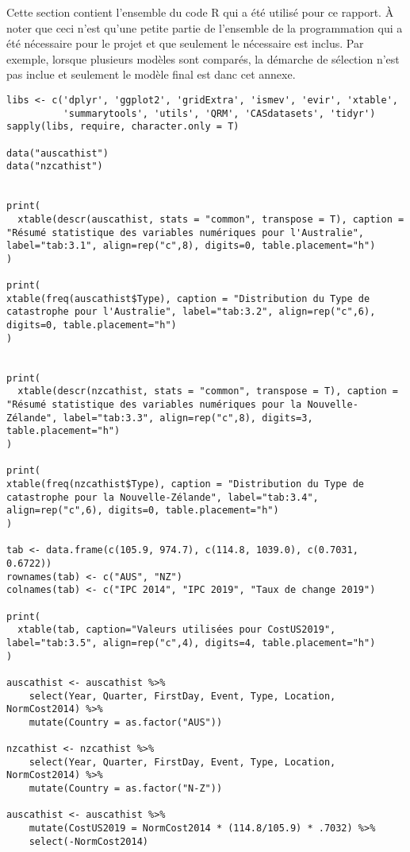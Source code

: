 Cette section contient l'ensemble du code \textsf{R} qui a été utilisé pour ce rapport. À noter que ceci n'est qu'une petite partie de l'ensemble de la programmation qui a été nécessaire pour le projet et que seulement le nécessaire est inclus. Par exemple, lorsque plusieurs modèles sont comparés, la démarche de sélection n'est pas inclue et seulement le modèle final est danc cet annexe.

\begin{lstlisting}
libs <- c('dplyr', 'ggplot2', 'gridExtra', 'ismev', 'evir', 'xtable',
          'summarytools', 'utils', 'QRM', 'CASdatasets', 'tidyr')
sapply(libs, require, character.only = T)

data("auscathist")
data("nzcathist")


print(
  xtable(descr(auscathist, stats = "common", transpose = T), caption = "Résumé statistique des variables numériques pour l'Australie", label="tab:3.1", align=rep("c",8), digits=0, table.placement="h")
)

print(
xtable(freq(auscathist$Type), caption = "Distribution du Type de catastrophe pour l'Australie", label="tab:3.2", align=rep("c",6), digits=0, table.placement="h")
)


print(
  xtable(descr(nzcathist, stats = "common", transpose = T), caption = "Résumé statistique des variables numériques pour la Nouvelle-Zélande", label="tab:3.3", align=rep("c",8), digits=3, table.placement="h")
)

print(
xtable(freq(nzcathist$Type), caption = "Distribution du Type de catastrophe pour la Nouvelle-Zélande", label="tab:3.4", align=rep("c",6), digits=0, table.placement="h")
)

tab <- data.frame(c(105.9, 974.7), c(114.8, 1039.0), c(0.7031, 0.6722))
rownames(tab) <- c("AUS", "NZ")
colnames(tab) <- c("IPC 2014", "IPC 2019", "Taux de change 2019")

print(
  xtable(tab, caption="Valeurs utilisées pour CostUS2019", label="tab:3.5", align=rep("c",4), digits=4, table.placement="h")
)

auscathist <- auscathist %>%
    select(Year, Quarter, FirstDay, Event, Type, Location, NormCost2014) %>%
    mutate(Country = as.factor("AUS"))

nzcathist <- nzcathist %>%
    select(Year, Quarter, FirstDay, Event, Type, Location, NormCost2014) %>%
    mutate(Country = as.factor("N-Z"))

auscathist <- auscathist %>%
    mutate(CostUS2019 = NormCost2014 * (114.8/105.9) * .7032) %>%
    select(-NormCost2014)


\end{lstlisting}
